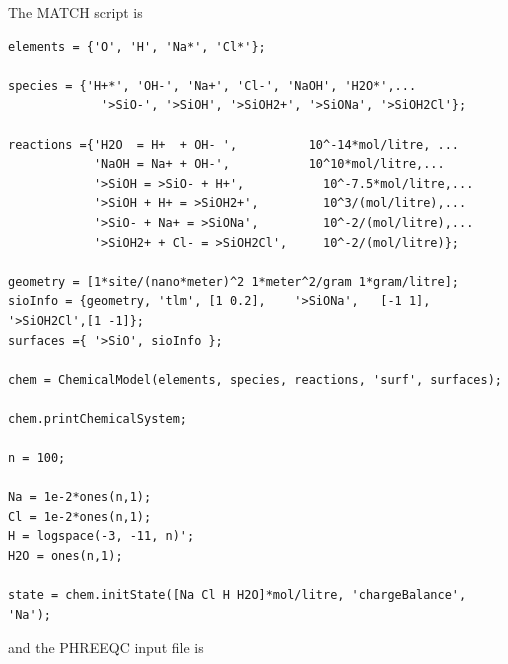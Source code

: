 \documentclass{article}
\begin{document}
The MATCH script is

\begin{lstlisting}
elements = {'O', 'H', 'Na*', 'Cl*'};

species = {'H+*', 'OH-', 'Na+', 'Cl-', 'NaOH', 'H2O*',...
             '>SiO-', '>SiOH', '>SiOH2+', '>SiONa', '>SiOH2Cl'};

reactions ={'H2O  = H+  + OH- ',          10^-14*mol/litre, ...
            'NaOH = Na+ + OH-',           10^10*mol/litre,...
            '>SiOH = >SiO- + H+',           10^-7.5*mol/litre,...
            '>SiOH + H+ = >SiOH2+',         10^3/(mol/litre),...
            '>SiO- + Na+ = >SiONa',         10^-2/(mol/litre),...
            '>SiOH2+ + Cl- = >SiOH2Cl',     10^-2/(mol/litre)};
        
geometry = [1*site/(nano*meter)^2 1*meter^2/gram 1*gram/litre];
sioInfo = {geometry, 'tlm', [1 0.2],	'>SiONa',   [-1 1], '>SiOH2Cl',[1 -1]};
surfaces ={ '>SiO', sioInfo };

chem = ChemicalModel(elements, species, reactions, 'surf', surfaces);

chem.printChemicalSystem;

n = 100;

Na = 1e-2*ones(n,1);
Cl = 1e-2*ones(n,1);
H = logspace(-3, -11, n)';
H2O = ones(n,1);

state = chem.initState([Na Cl H H2O]*mol/litre, 'chargeBalance', 'Na');
\end{lstlisting}
and the PHREEQC input file is
\end{document}
